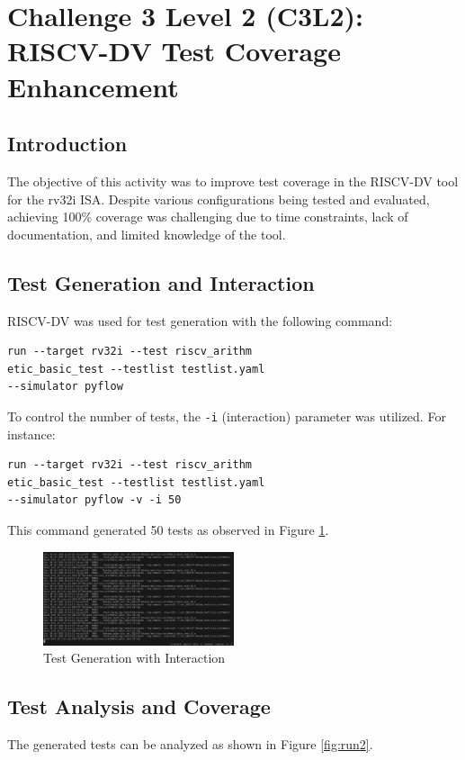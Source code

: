 \section{Challenge 3 Level 2 (C3L2): RISCV-DV Test Coverage Enhancement}

\subsection{Introduction}
The objective of this activity was to improve test coverage in the RISCV-DV tool for the rv32i ISA. Despite various configurations being tested and evaluated, achieving 100\% coverage was challenging due to time constraints, lack of documentation, and limited knowledge of the tool.

\subsection{Test Generation and Interaction}
RISCV-DV was used for test generation with the following command:

\begin{verbatim}
run --target rv32i --test riscv_arithm
etic_basic_test --testlist testlist.yaml
--simulator pyflow
\end{verbatim}

To control the number of tests, the \texttt{-i} (interaction) parameter was utilized. For instance:

\begin{verbatim}
run --target rv32i --test riscv_arithm
etic_basic_test --testlist testlist.yaml
--simulator pyflow -v -i 50
\end{verbatim}

This command generated 50 tests as observed in Figure \ref{fig:run1}.

\begin{figure}[h]
  \centering
  \includegraphics[width=0.5\textwidth]{./c3l2_img/run1.png}
  \caption{Test Generation with Interaction}
  \label{fig:run1}
\end{figure}

\subsection{Test Analysis and Coverage}
The generated tests can be analyzed as shown in Figure \ref{fig:run2}.


